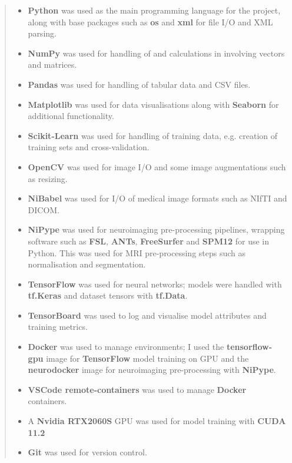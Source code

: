 \documentclass[
    author={Kai Hulme},
    supervisor={Dr Jon Bird},
    degree={BSc},
    title={Generative Adversarial Networks as an Augmentation Technique},
    subtitle={for Alzheimer's Disease Detection in MRI Volumes},
    type={Research},
    year={2021} 
]{dissertation}
\begin{document}
\begin{quote}
\noindent
\begin{itemize}

\item \textbf{Python} was used as the main programming language for the project, along with base packages such as \textbf{os} and \textbf{xml} for file I/O and XML parsing.
\item \textbf{NumPy} was used for handling of and calculations in involving vectors and matrices.
\item \textbf{Pandas} was used for handling of tabular data and CSV files.
\item \textbf{Matplotlib} was used for data visualisations along with \textbf{Seaborn} for additional functionality.
\item \textbf{Scikit-Learn} was used for handling of training data, e.g. creation of training sets and cross-validation.
\item \textbf{OpenCV} was used for image I/O and some image augmentations such as resizing.
\item \textbf{NiBabel} was used for I/O of medical image formats such as NIfTI and DICOM.
\item \textbf{NiPype} was used for neuroimaging pre-processing pipelines, wrapping software such as \textbf{FSL}, \textbf{ANTs}, \textbf{FreeSurfer} and \textbf{SPM12} for use in Python. This was used for MRI pre-processing steps such as normalisation and segmentation.
\item \textbf{TensorFlow} was used for neural networks; models were handled with \textbf{tf.Keras} and dataset tensors with \textbf{tf.Data}.
\item \textbf{TensorBoard} was used to log and visualise model attributes and training metrics.
\item \textbf{Docker} was used to manage environments; I used the \textbf{tensorflow-gpu} image for \textbf{TensorFlow} model training on GPU and the \textbf{neurodocker} image for neuroimaging pre-processing with \textbf{NiPype}.
\item \textbf{VSCode remote-containers} was used to manage \textbf{Docker} containers.
\item A \textbf{Nvidia RTX2060S} GPU was used for model training with \textbf{CUDA 11.2}
\item \textbf{Git} was used for version control.
      
\end{itemize}
\end{quote}
\end{document}
